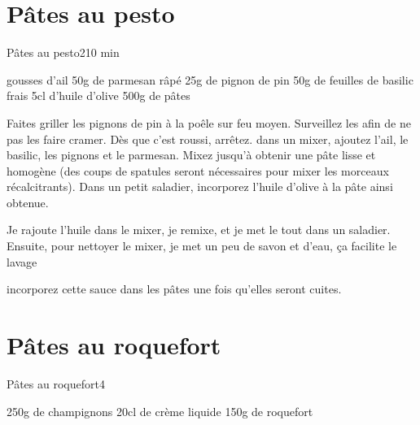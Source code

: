 {\section{Pâtes au pesto}
\begin{recette}{Pâtes au pesto}{2}{10 min}{}
\begin{ingredients}
 gousses d'ail
\ingredient 50g de parmesan râpé
\ingredient 25g de pignon de pin
\ingredient 50g de feuilles de basilic frais
\ingredient 5cl d'huile d'olive
\ingredient 500g de pâtes
\end{ingredients}

\begin{preparation}
\etape Faites griller les pignons de pin à la poêle sur feu moyen. Surveillez les afin de ne pas les faire cramer. Dès que 
c'est roussi, arrêtez.
\etape dans un mixer, ajoutez l'ail, le basilic, les pignons et le parmesan. Mixez jusqu'à obtenir une pâte lisse et homogène 
(des coups de spatules seront nécessaires pour mixer les morceaux récalcitrants). 
\etape Dans un petit saladier, incorporez l'huile d'olive à la pâte ainsi obtenue. 
\begin{remarque}
Je rajoute l'huile dans le mixer, je remixe, et je met le tout dans un saladier. Ensuite, pour nettoyer le mixer, je met un peu 
de savon et d'eau, ça facilite le lavage
\end{remarque}
\etape incorporez cette sauce dans les pâtes une fois qu'elles seront cuites. 

\end{preparation}
\end{recette}

\section{Pâtes au roquefort}
\begin{recette}{Pâtes au roquefort}{4}{}{}
\begin{ingredients}
\ingredient 250g de champignons
\ingredient 20cl de crème liquide
\ingredient 150g de roquefort
\end{ingredients}


\end{recette}}
